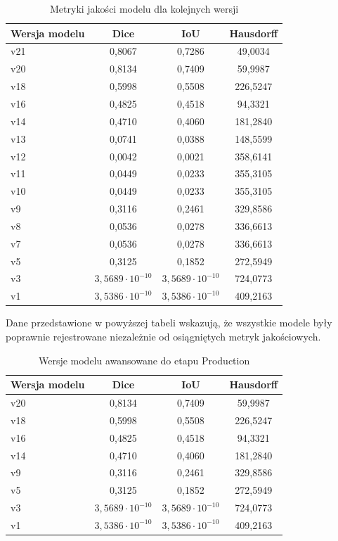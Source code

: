 \begin{table}[H]
\centering
\caption{Metryki jakości modelu dla kolejnych wersji}
\label{tab:metryki}
\begin{tabular}{|l|c|c|c|}
\hline
\textbf{Wersja modelu} & \textbf{Dice} & \textbf{IoU} & \textbf{Hausdorff} \\
\hline
v21  & 0{,}8067 & 0{,}7286 & 49{,}0034 \\
v20  & 0{,}8134 & 0{,}7409 & 59{,}9987 \\
v18  & 0{,}5998 & 0{,}5508 & 226{,}5247 \\
v16  & 0{,}4825 & 0{,}4518 & 94{,}3321 \\
v14  & 0{,}4710 & 0{,}4060 & 181{,}2840 \\
v13  & 0{,}0741 & 0{,}0388 & 148{,}5599 \\
v12  & 0{,}0042 & 0{,}0021 & 358{,}6141 \\
v11  & 0{,}0449 & 0{,}0233 & 355{,}3105 \\
v10  & 0{,}0449 & 0{,}0233 & 355{,}3105 \\
v9   & 0{,}3116 & 0{,}2461 & 329{,}8586 \\
v8   & 0{,}0536 & 0{,}0278 & 336{,}6613 \\
v7   & 0{,}0536 & 0{,}0278 & 336{,}6613 \\
v5   & 0{,}3125 & 0{,}1852 & 272{,}5949 \\
v3   & $3{,}5689\cdot 10^{-10}$ & $3{,}5689\cdot 10^{-10}$ & 724{,}0773 \\
v1   & $3{,}5386\cdot 10^{-10}$ & $3{,}5386\cdot 10^{-10}$ & 409{,}2163 \\
\hline
\end{tabular}
\end{table}

Dane przedstawione w powyższej tabeli wskazują, że wszystkie modele były poprawnie rejestrowane niezależnie od osiągniętych metryk jakościowych.

\begin{table}[H]
\centering
\caption{Wersje modelu awansowane do etapu Production}
\label{tab:metryki-production}
\begin{tabular}{|l|c|c|c|}
\hline
\textbf{Wersja modelu} & \textbf{Dice} & \textbf{IoU} & \textbf{Hausdorff} \\
\hline
v20  & 0{,}8134 & 0{,}7409 & 59{,}9987 \\
v18  & 0{,}5998 & 0{,}5508 & 226{,}5247 \\
v16  & 0{,}4825 & 0{,}4518 & 94{,}3321 \\
v14  & 0{,}4710 & 0{,}4060 & 181{,}2840 \\
v9   & 0{,}3116 & 0{,}2461 & 329{,}8586 \\
v5   & 0{,}3125 & 0{,}1852 & 272{,}5949 \\
v3   & $3{,}5689\cdot 10^{-10}$ & $3{,}5689\cdot 10^{-10}$ & 724{,}0773 \\
v1   & $3{,}5386\cdot 10^{-10}$ & $3{,}5386\cdot 10^{-10}$ & 409{,}2163 \\
\hline
\end{tabular}
\end{table}

